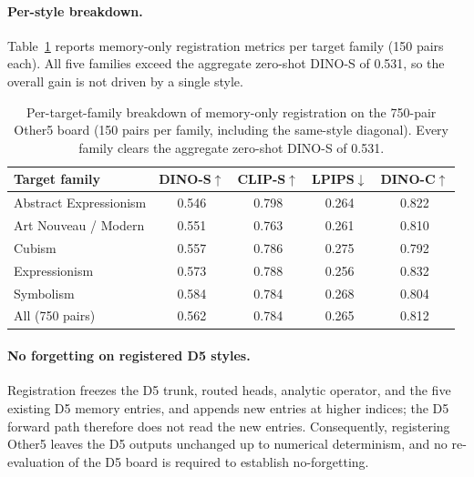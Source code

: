 \documentclass[letterpaper]{article}
\begin{document}
\paragraph{Per-style breakdown.}
Table~\ref{tab:supp-register-perstyle} reports memory-only registration metrics per target
family (150 pairs each). All five families exceed the aggregate zero-shot DINO-S of 0.531,
so the overall gain is not driven by a single style.

\begin{table}[t]
\centering
\small
\setlength{\tabcolsep}{4pt}
\begin{tabular}{@{}lcccc@{}}
\toprule
Target family & DINO-S$\uparrow$ & CLIP-S$\uparrow$ & LPIPS$\downarrow$ & DINO-C$\uparrow$ \\
\midrule
Abstract Expressionism & 0.546 & 0.798 & 0.264 & 0.822 \\
Art Nouveau / Modern   & 0.551 & 0.763 & 0.261 & 0.810 \\
Cubism                 & 0.557 & 0.786 & 0.275 & 0.792 \\
Expressionism          & 0.573 & 0.788 & 0.256 & 0.832 \\
Symbolism              & 0.584 & 0.784 & 0.268 & 0.804 \\
\midrule
All (750 pairs)        & 0.562 & 0.784 & 0.265 & 0.812 \\
\bottomrule
\end{tabular}
\caption{Per-target-family breakdown of memory-only registration on the 750-pair Other5
board (150 pairs per family, including the same-style diagonal). Every family clears the
aggregate zero-shot DINO-S of 0.531.}
\label{tab:supp-register-perstyle}
\end{table}

\paragraph{No forgetting on registered D5 styles.}
Registration freezes the D5 trunk, routed heads, analytic operator, and the five existing D5
memory entries, and appends new entries at higher indices; the D5 forward path therefore does
not read the new entries. Consequently, registering Other5 leaves the D5 outputs unchanged up
to numerical determinism, and no re-evaluation of the D5 board is required to establish
no-forgetting.
\end{document}
